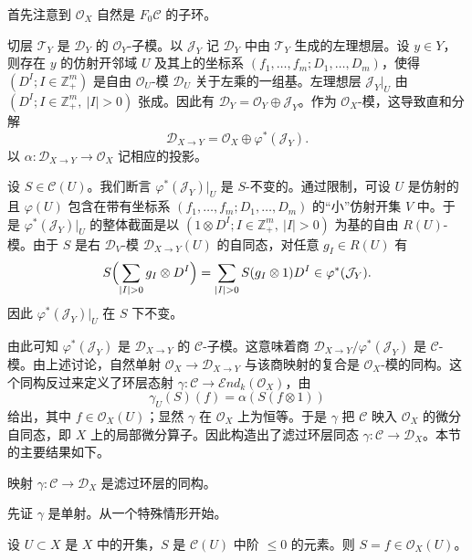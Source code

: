 首先注意到 $\mathcal{O}_X$ 自然是 $F_0\mathcal{C}$ 的子环。

切层 $\mathcal{T}_Y$ 是 $\mathcal{D}_Y$ 的 $\mathcal{O}_Y$-子模。以 $\mathcal{J}_Y$ 记 $\mathcal{D}_Y$ 中由
$\mathcal{T}_Y$ 生成的左理想层。设 $y\in Y$，则存在 $y$ 的仿射开邻域 $U$ 及其上的坐标系
$(f_1,\dots,f_m;D_1,\dots,D_m)$，使得 $(D^I;I\in\mathbb{Z}_+^m)$ 是自由 $\mathcal{O}_U$-模 $\mathcal{D}_U$
关于左乘的一组基。左理想层 $\mathcal{J}_Y|_U$ 由 $(D^I;I\in\mathbb{Z}_+^m,\ |I|>0)$ 张成。因此有
$\mathcal{D}_Y=\mathcal{O}_Y\oplus\mathcal{J}_Y$。作为 $\mathcal{O}_X$-模，这导致直和分解
$$\mathcal{D}_{X\to Y}=\mathcal{O}_X\oplus\varphi^*(\mathcal{J}_Y).$$
以 $\alpha:\mathcal{D}_{X\to Y}\to\mathcal{O}_X$ 记相应的投影。

设 $S\in\mathcal{C}(U)$。我们断言 $\varphi^*(\mathcal{J}_Y)|_U$ 是 $S$-不变的。通过限制，可设 $U$ 是仿射的且
$\varphi(U)$ 包含在带有坐标系 $(f_1,\dots,f_m;D_1,\dots,D_m)$ 的“小”仿射开集 $V$ 中。于是
$\varphi^*(\mathcal{J}_Y)|_U$ 的整体截面是以 $(1\otimes D^I;I\in\mathbb{Z}_+^m,\ |I|>0)$ 为基的自由
$R(U)$-模。由于 $S$ 是右 $\mathcal{D}_V$-模 $\mathcal{D}_{X\to Y}(U)$ 的自同态，对任意 $g_I\in R(U)$ 有
$$S\Bigl(\sum_{|I|>0}g_I\otimes D^I\Bigr)=\sum_{|I|>0}S(g_I\otimes 1)D^I\in\varphi^*(\mathcal{J}_Y).$$
因此 $\varphi^*(\mathcal{J}_Y)|_U$ 在 $S$ 下不变。

由此可知 $\varphi^*(\mathcal{J}_Y)$ 是 $\mathcal{D}_{X\to Y}$ 的 $\mathcal{C}$-子模。这意味着商
$\mathcal{D}_{X\to Y}/\varphi^*(\mathcal{J}_Y)$ 是 $\mathcal{C}$-模。由上述讨论，自然单射
$\mathcal{O}_X\to\mathcal{D}_{X\to Y}$ 与该商映射的复合是 $\mathcal{O}_X$-模的同构。这个同构反过来定义了环层态射
$\gamma:\mathcal{C}\to\mathcal{E}nd_k(\mathcal{O}_X)$，由
$$\gamma_U(S)(f)=\alpha(S(f\otimes 1))$$
给出，其中 $f\in\mathcal{O}_X(U)$；显然 $\gamma$ 在 $\mathcal{O}_X$ 上为恒等。于是 $\gamma$ 把 $\mathcal{C}$ 映入
$\mathcal{O}_X$ 的微分自同态，即 $X$ 上的局部微分算子。因此构造出了滤过环层同态
$\gamma:\mathcal{C}\to\mathcal{D}_X$。本节的主要结果如下。

\begin{theorem}\label{thm:4.1.2}
映射 $\gamma:\mathcal{C}\to\mathcal{D}_X$ 是滤过环层的同构。
\end{theorem}

先证 $\gamma$ 是单射。从一个特殊情形开始。

\begin{lemma}\label{lem:4.1.3}
设 $U\subset X$ 是 $X$ 中的开集，$S$ 是 $\mathcal{C}(U)$ 中阶 $\le 0$ 的元素。则 $S=f\in\mathcal{O}_X(U)$。
\end{lemma}

